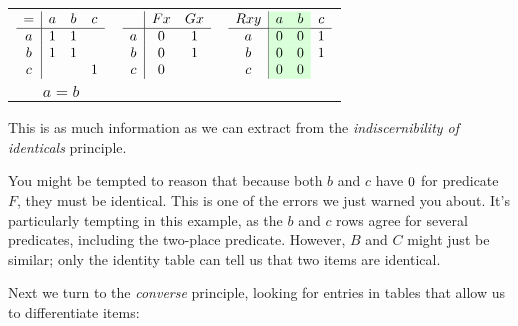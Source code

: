 \documentclass[PHIL101-Textbook.tex]{subfiles}
\begin{document}
\begin{center}
  \begin{tabular}{ccc}
   $\begin{array}{c|ccc}
	   = & a & b & c\\ \hline
	   a & 1 & 1 &\\
	   b & 1 & 1 &\\
	   c & & & 1
	\end{array}$
	 &
   $\begin{array}{c|cc}
	  & \mathord{F}{x} & \mathord{G}{x}\\ \hline
	  a & 0 & 1 \\
	  b & 0 & 1 \\
	  c & 0 &
	\end{array}$
	 &
	$\begin{array}{c|ccc}
	  \atom R {xy} &\cellcolor{green!15} a & \cellcolor{green!15} b & c\\ \hline
	  a & \cellcolor{green!15} \vF& \cellcolor{green!15}\vF & \vT \\
	  b & \cellcolor{green!15} \vF& \cellcolor{green!15}\vF & \vT \\
	  c & \cellcolor{green!15} \vF& \cellcolor{green!15}\vF & 
				\end{array}$\\
	$a=b$
  \end{tabular}
\end{center}

\noindent This is as much information as we can extract from the \emph{indiscernibility of identicals} principle.

\medskip

You might be tempted to reason that because both $b$ and $c$ have $0$ for predicate $F$, they must be identical. This is one of the errors we just warned you about. It's particularly tempting in this example, as the $b$ and $c$ rows agree for several predicates, including the two-place predicate. However, $B$ and $C$ might just be similar; only the identity table can tell us that two items are identical.

\pagebreak

Next we turn to the \emph{converse} principle, looking for entries in tables that allow us to differentiate items:
\end{document}
